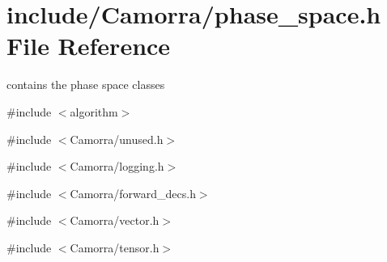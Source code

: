 \hypertarget{a00686}{
\section{include/Camorra/phase\_\-space.h File Reference}
\label{a00686}
}


contains the phase space classes  


{\ttfamily \#include $<$algorithm$>$}\par
{\ttfamily \#include $<$Camorra/unused.h$>$}\par
{\ttfamily \#include $<$Camorra/logging.h$>$}\par
{\ttfamily \#include $<$Camorra/forward\_\-decs.h$>$}\par
{\ttfamily \#include $<$Camorra/vector.h$>$}\par
{\ttfamily \#include $<$Camorra/tensor.h$>$}\par
